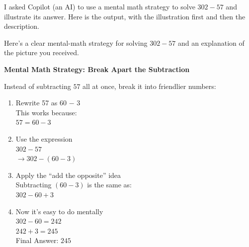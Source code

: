 \documentclass[nooutcomes,noauthor,handout]{ximera}
\begin{document}
\begin{problem}
I asked Copilot (an AI) to use a mental math strategy to solve $302-57$ and illustrate its answer. Here is the output, with the illustration first and then the description.

\begin{explanation}

\begin{image}
\end{image}


Here's a clear mental-math strategy for solving $302-57$ and an explanation of the picture you received. 

{\bf Mental Math Strategy: Break Apart the Subtraction}

Instead of subtracting $57$ all at once, break it into friendlier numbers: 

\begin{enumerate}[label=\arabic*.]
	\item Rewrite 57 as 60 − 3 \\
	This works because: \\
	$57 = 60-3$
	\item  Use the expression \\
	$302-57$ \\
	$\rightarrow 302 - (60 - 3)$ 
	\item Apply the ``add the opposite'' idea \\
	Subtracting $(60 - 3)$ is the same as: \\
	$302 - 60 + 3$
	\item Now it's easy to do mentally \\
		$302 - 60 = 242$ \\
		$242 + 3 = 245 $\\
		Final Answer: $245$
\end{enumerate}		


\end{explanation}
\end{problem}
\end{document}
